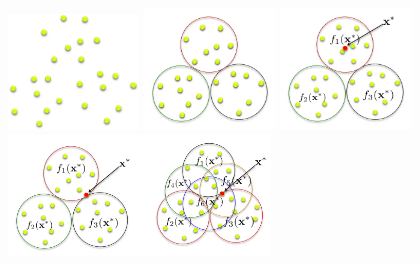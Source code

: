 
\begin{figure}[t]
\centering
\includegraphics[width=0.31\textwidth]{ODC_intro_1.png}
\includegraphics[width=0.31\textwidth]{ODC_intro_2.png}%
\includegraphics[width=0.31\textwidth]{ODC_intro_3.png}
\includegraphics[width=0.62\textwidth]{ODC_intro_4.png}

\end{figure}
